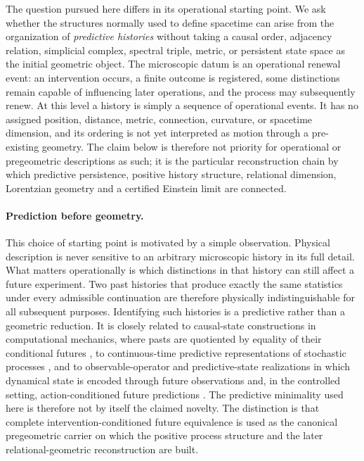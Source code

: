 \documentclass[11pt]{article}
\numberwithin{equation}{section}
\theoremstyle{definition}
\theoremstyle{remark}
\begin{document}
The question pursued here differs in its operational starting point.  We ask
whether the structures normally used to define spacetime can arise from the
organization of \emph{predictive histories} without taking a causal order,
adjacency relation, simplicial complex, spectral triple, metric, or persistent
state space as the initial geometric object.  The microscopic datum is an
operational renewal event: an intervention occurs, a finite outcome is
registered, some distinctions remain capable of influencing later operations,
and the process may subsequently renew.  At this level a history is simply a
sequence of operational events.  It has no assigned position, distance, metric,
connection, curvature, or spacetime dimension, and its ordering is not yet
interpreted as motion through a pre-existing geometry.  The claim below is
therefore not priority for operational or pregeometric descriptions as such;
it is the particular reconstruction chain by which predictive persistence,
positive history structure, relational dimension, Lorentzian geometry and a
certified Einstein limit are connected.

\paragraph{Prediction before geometry.}
This choice of starting point is motivated by a simple observation.  Physical
description is never sensitive to an arbitrary microscopic history in its full
detail.  What matters operationally is which distinctions in that history can
still affect a future experiment.  Two past histories that produce exactly the
same statistics under every admissible continuation are therefore physically
indistinguishable for all subsequent purposes.  Identifying such histories is
a predictive rather than a geometric reduction.  It is closely related to
causal-state constructions in computational mechanics, where pasts are
quotiented by equality of their conditional futures
\cite{shalizicrutchfield,TraversCrutchfield2014}, to continuous-time
predictive representations of stochastic processes
\cite{MarzenCrutchfield2017,JurgensCrutchfield2021}, and to observable-operator
and predictive-state realizations in which dynamical state is encoded through
future observations and, in the controlled setting, action-conditioned future
predictions \cite{Jaeger2000,LittmanSuttonSingh2002}.  The predictive
minimality used here is therefore not by itself the claimed novelty.  The
distinction is that complete intervention-conditioned future equivalence is
used as the canonical pregeometric carrier on which the positive process
structure and the later relational-geometric reconstruction are built.
\end{document}
